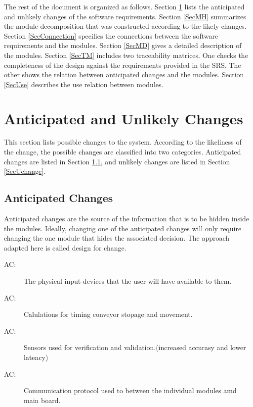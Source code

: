 \documentclass[12pt, titlepage]{article}
\newcounter{acnum}
\newcommand{\actheacnum}{AC\theacnum}
\begin{document}
The rest of the document is organized as follows. Section
\ref{SecChange} lists the anticipated and unlikely changes of the software
requirements. Section \ref{SecMH} summarizes the module decomposition that
was constructed according to the likely changes. Section \ref{SecConnection}
specifies the connections between the software requirements and the
modules. Section \ref{SecMD} gives a detailed description of the
modules. Section \ref{SecTM} includes two traceability matrices. One checks
the completeness of the design against the requirements provided in the SRS. The
other shows the relation between anticipated changes and the modules. Section
\ref{SecUse} describes the use relation between modules.

\section{Anticipated and Unlikely Changes} \label{SecChange}

This section lists possible changes to the system. According to the likeliness
of the change, the possible changes are classified into two
categories. Anticipated changes are listed in Section \ref{SecAchange}, and
unlikely changes are listed in Section \ref{SecUchange}.

\subsection{Anticipated Changes} \label{SecAchange}

Anticipated changes are the source of the information that is to be hidden
inside the modules. Ideally, changing one of the anticipated changes will only
require changing the one module that hides the associated decision. The approach
adapted here is called design for
change.

\begin{description}
\item[ \actheacnum \label{acphy}:] The physical input
devices that the user will have available to them.
\item[ \actheacnum \label{accal}:] Calulations for timing conveyor
stopage and movement.
\item[ \actheacnum \label{acsen}:] Sensors used for verification and 
validation.(increased accurasy and lower latency)
\item[ \actheacnum \label{accom}:] Communication protocol used to 
between the individual modules amd main board.

\end{description}
\end{document}
